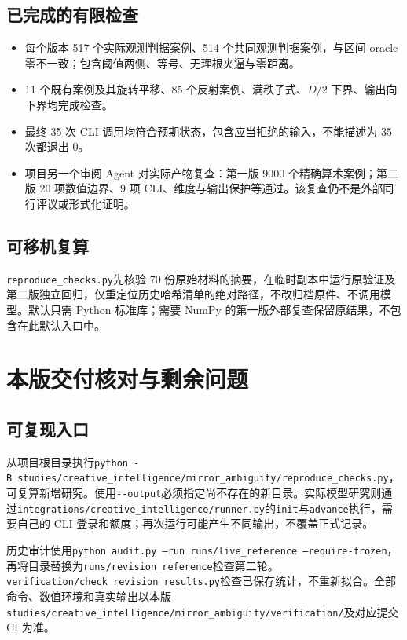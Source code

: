 \documentclass[UTF8,a4paper,zihao=-4,fontset=none]{ctexart}
\newcommand{\code}[1]{{\small\nolinkurl{#1}}}
\begin{document}
\subsection{已完成的有限检查}
\begin{itemize}
\item 每个版本 517 个实际观测判据案例、514 个共同观测判据案例，与区间 oracle 零不一致；包含阈值两侧、等号、无理根夹逼与零距离。
\item 11 个既有案例及其旋转平移、85 个反射案例、满秩子式、$D/2$ 下界、输出向下界均完成检查。
\item 最终 35 次 CLI 调用均符合预期状态，包含应当拒绝的输入，不能描述为 35 次都退出 0。
\item 项目另一个审阅 Agent 对实际产物复查：第一版 9000 个精确算术案例；第二版 20 项数值边界、9 项 CLI、维度与输出保护等通过。该复查仍不是外部同行评议或形式化证明。
\end{itemize}

\subsection{可移机复算}
\code{reproduce_checks.py}先核验 70 份原始材料的摘要，在临时副本中运行原验证及第二版独立回归，仅重定位历史哈希清单的绝对路径，不改归档原件、不调用模型。默认只需 Python 标准库；需要 NumPy 的第一版外部复查保留原结果，不包含在此默认入口中。

\newpage
\begingroup\small\linespread{1.04}\selectfont
\section{本版交付核对与剩余问题}
\label{sec:delivery}
\subsection{可复现入口}
从项目根目录执行\texttt{python -B}\ \code{studies/creative_intelligence/mirror_ambiguity/reproduce_checks.py}，可复算新增研究。使用\code{--output}必须指定尚不存在的新目录。实际模型研究则通过\code{integrations/creative_intelligence/runner.py}的\code{init}与\code{advance}执行，需要自己的 CLI 登录和额度；再次运行可能产生不同输出，不覆盖正式记录。

历史审计使用\texttt{python audit.py --run}\ \code{runs/live_reference}\ \texttt{--require-frozen}，再将目录替换为\code{runs/revision_reference}检查第二轮。\code{verification/check_revision_results.py}检查已保存统计，不重新拟合。全部命令、数值环境和真实输出以本版\code{studies/creative_intelligence/mirror_ambiguity/verification/}及对应提交 CI 为准。
\end{document}

